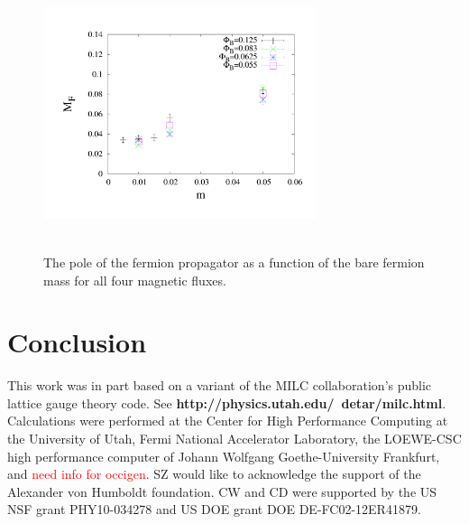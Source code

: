 \documentclass[aps,prd,twocolumn,showpacs,superscriptaddress,groupedaddress]{revtex4}  %
\begin{document}
\begin{figure}
  \includegraphics[height=8cm,width=8cm]{ferm_mt_vs_m_graphene_paper.pdf} \hspace{-1cm}
\caption{The pole of the fermion propagator as a function of the bare fermion mass for all four magnetic fluxes.}
\label{MFvsm}
\end{figure}

\section{\label{sec:Conclusion}Conclusion}

\acknowledgements
This work was in part based on a variant of the MILC collaboration's public lattice gauge theory code. See {\bf http://physics.utah.edu/~detar/milc.html}.
Calculations were performed at the Center for High Performance Computing at the University of Utah, Fermi National Accelerator Laboratory, the LOEWE-CSC high performance
computer of Johann Wolfgang Goethe-University Frankfurt, and \textcolor{red}{need info for occigen}.
SZ would like to acknowledge the support of the Alexander von Humboldt foundation. CW and CD were supported by the US NSF grant PHY10-034278 and US DOE grant DOE DE-FC02-12ER41879.

\appendix
\end{document}
